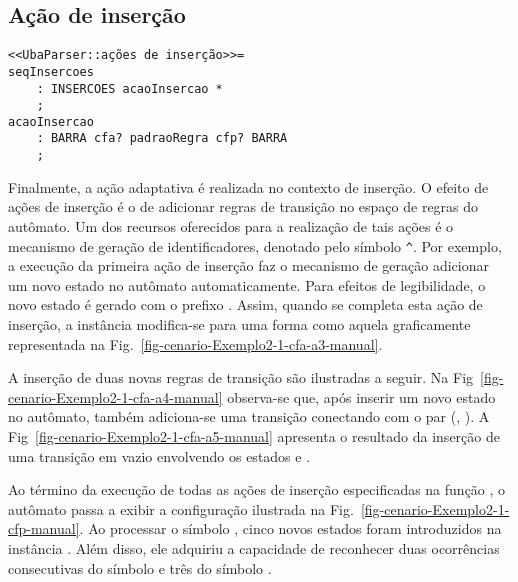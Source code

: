 \subsection*{Ação de inserção}
\label{sec:acao:insercao}

\begin{lstlisting}[style=antlr]
<<UbaParser::ações de inserção>>=
seqInsercoes
    : INSERCOES acaoInsercao *
    ;
acaoInsercao
    : BARRA cfa? padraoRegra cfp? BARRA
    ;
\end{lstlisting}

Finalmente, a ação adaptativa  é realizada no contexto de inserção. O efeito de ações de inserção é o de adicionar regras de transição no espaço de regras do autômato. Um dos recursos oferecidos para a realização de tais ações é o mecanismo de geração de identificadores, denotado pelo símbolo \lstinline|^|. Por exemplo, a execução da primeira ação de inserção faz o mecanismo de geração adicionar um novo estado no autômato  automaticamente. Para efeitos de legibilidade, o novo estado é gerado com o prefixo . Assim, quando se completa esta ação de inserção, a instância  modifica-se para uma forma como aquela graficamente representada na Fig.~\ref{fig-cenario-Exemplo2-1-cfa-a3-manual}.



A inserção de duas novas regras de transição são ilustradas a seguir. Na Fig~\ref{fig-cenario-Exemplo2-1-cfa-a4-manual} observa-se que, após inserir um novo estado  no autômato, também adiciona-se uma transição conectando com o par (, ). A Fig~\ref{fig-cenario-Exemplo2-1-cfa-a5-manual} apresenta o resultado da inserção de uma transição em vazio envolvendo os estados  e .


Ao término da execução de todas as ações de inserção especificadas na função , o autômato passa a exibir a configuração ilustrada na Fig.~\ref{fig-cenario-Exemplo2-1-cfp-manual}. Ao processar o símbolo , cinco novos estados foram introduzidos na instância . Além disso, ele adquiriu a capacidade de reconhecer duas ocorrências consecutivas do símbolo  e três do símbolo .


